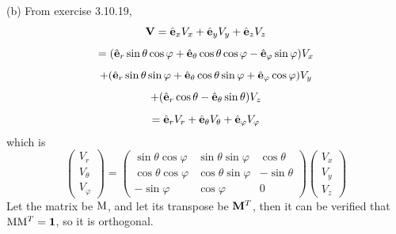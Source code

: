 \documentclass[a4paper]{article}
\begin{document}
(b)
From exercise 3.10.19,
\[
\mathbf{V}=\hat{\mathbf{e}}_xV_x+\hat{\mathbf{e}}_yV_y+\hat{\mathbf{e}}_zV_z
\]
\[
=(\hat{\mathbf{e}}_r\sin\theta\cos\varphi+\hat{\mathbf{e}}_\theta\cos\theta\cos\varphi-\hat{\mathbf{e}}_\varphi\sin\varphi)V_x
\]
\[+(\hat{\mathbf{e}}_r\sin\theta\sin\varphi+\hat{\mathbf{e}}_\theta\cos\theta\sin\varphi+\hat{\mathbf{e}}_\varphi\cos\varphi)V_y\]
\[+(\hat{\mathbf{e}}_r\cos\theta-\hat{\mathbf{e}}_\theta\sin\theta)V_z
\]
\[
=\hat{\mathbf{e}}_rV_r+\hat{\mathbf{e}}_\theta V_\theta+\hat{\mathbf{e}}_\varphi V_\varphi
\]
which is
\[
\begin{pmatrix}
V_r\\V_\theta\\V_\varphi
\end{pmatrix}=
\begin{pmatrix}
\sin\theta\cos\varphi&\sin\theta\sin\varphi&\cos\theta\\
\cos\theta\cos\varphi&\cos\theta\sin\varphi&-\sin\theta\\
-\sin\varphi&\cos\varphi&0
\end{pmatrix}
\begin{pmatrix}
V_x\\V_y\\V_z
\end{pmatrix}
\]
Let the matrix be $\mathrm{M}$, and let its transpose be $\mathbf{M}^T$, then it can be verified that $\mathrm{M}\mathrm{M}^T=\boldsymbol{1}$, so it is orthogonal.
\end{document}

